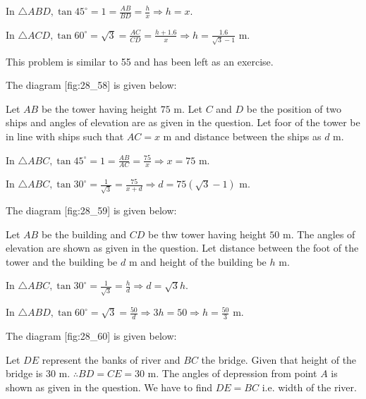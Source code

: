   In $\triangle ABD, \tan45^\circ = 1 = \frac{AB}{BD} = \frac{h}{x} \Rightarrow h = x$.

  In $\triangle ACD, \tan60^\circ = \sqrt{3} = \frac{AC}{CD} = \frac{h + 1.6}{x} \Rightarrow h = \frac{1.6}{\sqrt{3} -
    1}$ m.

\item This problem is similar to 55 and has been left as an exercise.

\item The diagram [fig:28_58] is given below:

  \startplacefigure[reference=fig:28_58]
    \externalfigure[28_58.pdf]
  \stopplacefigure

  Let $AB$ be the tower having height $75$ m. Let $C$ and $D$ be the position of two ships and angles of
  elevation are as given in the question. Let foor of the tower be in line with ships such that $AC = x$ m and distance
  between the ships as $d$ m.

  In $\triangle ABC, \tan45^\circ = 1 = \frac{AB}{AC} = \frac{75}{x} \Rightarrow x = 75$ m.

  In $\triangle ABC, \tan30^\circ = \frac{1}{\sqrt{3}} = \frac{75}{x + d} \Rightarrow d = 75(\sqrt{3} - 1)$ m.

\item The diagram [fig:28_59] is given below:

  \startplacefigure[reference=fig:28_59]
    \externalfigure[28_59.pdf]
  \stopplacefigure

  Let $AB$ be the building and $CD$ be thw tower having height $50$ m. The angles of elevation are shown as
  given in the question. Let distance between the foot of the tower and the building be $d$ m and height of the building be
  $h$ m.

  In $\triangle ABC, \tan30^\circ = \frac{1}{\sqrt{3}} = \frac{h}{d} \Rightarrow d = \sqrt{3}h$.

  In $\triangle ABD, \tan60^\circ = \sqrt{3} = \frac{50}{d} \Rightarrow 3h = 50 \Rightarrow h = \frac{50}{3}$ m.

\item The diagram [fig:28_60] is given below:

  \startplacefigure[reference=fig:28_60]
    \externalfigure[28_60.pdf]
  \stopplacefigure

  Let $DE$ represent the banks of river and $BC$ the  bridge. Given that height of the bridge is
  $30$ m. $\therefore BD = CE = 30$ m. The angles of depression from point $A$ is shown as given in the
  question. We have to find $DE = BC$ i.e. width of the river.

